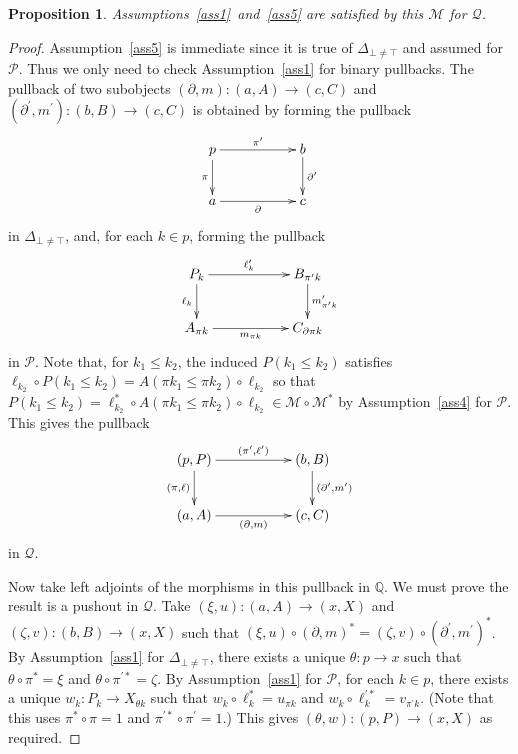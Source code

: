 \documentclass[a4paper,12pt,reqno]{amsart}
\newtheorem{proposition}[theorem]{Proposition}
\theoremstyle{definition}
\theoremstyle{fact}
\theoremstyle{genquest}
\theoremstyle{step}
\newcommand{\lra}{\longrightarrow}
\newcommand{\ra}{\rightarrow}
\def\CM{{\mathscr M}}
\def\CP{{\mathscr P}}
\def\CQ{{\mathscr Q}}
\begin{document}
\begin{proposition}\label{meets}
Assumptions~\ref{ass1}~and~\ref{ass5} are satisfied by this $\CM$ for $\CQ$.
\end{proposition}
\begin{proof}
Assumption~\ref{ass5} is immediate since it is true of $\Delta_{\bot \neq \top}$ and assumed for $\CP$. Thus we only need to check Assumption~\ref{ass1}
for binary pullbacks.  
The pullback of two subobjects $(\partial,m):(a,A)\lra (c,C)$ and 
$(\partial^{\prime},m^{\prime}):(b,B)\lra (c,C)$ is obtained by forming the pullback  
\begin{equation*}
\xymatrix{
p \ar[rr]^-{\pi^{\prime}} \ar[d]_-{\pi} && b \ar[d]^-{\partial^{\prime}} \\
a \ar[rr]_-{\partial} && c}
\end{equation*}
in $\Delta_{\bot \neq \top}$, and, for each $k\in p$, forming the pullback 
\begin{equation*}
\xymatrix{
P_k \ar[rr]^-{\ell_k^{\prime}} \ar[d]_-{\ell_k} && B_{\pi^{\prime} k} \ar[d]^-{m^{\prime}_{\pi^{\prime}k}} \\
A_{\pi k} \ar[rr]_-{m_{\pi k}} && C_{\partial \pi k}}
\end{equation*}
in $\CP$. Note that, for $k_1\le k_2$, the induced $P(k_1\le k_2)$ satisfies
$\ell_{k_2}\circ P(k_1\le k_2) = A(\pi k_1\le \pi k_2)\circ \ell_{k_2}$ so that
$P(k_1\le k_2) = \ell_{k_2}^*\circ A(\pi k_1\le \pi k_2)\circ \ell_{k_2} \in \CM \circ \CM^*$
by Assumption~\ref{ass4} for $\CP$.  
This gives the pullback
\begin{equation*}
\xymatrix{
(p,P) \ar[rr]^-{(\pi^{\prime},\ell^{\prime})} \ar[d]_-{(\pi,\ell)} && (b,B) \ar[d]^-{(\partial^{\prime},m^{\prime})} \\
(a,A) \ar[rr]_-{(\partial,m)} && (c,C)}
\end{equation*}
in $\CQ$.

Now take left adjoints of the morphisms in this pullback in $\mathbb{Q}$.
We must prove the result is a pushout in $\CQ$.
Take $(\xi,u):(a,A)\ra (x,X)$ and $(\zeta,v):(b,B)\ra (x,X)$ such that
$(\xi,u)\circ (\partial,m)^* = (\zeta,v)\circ (\partial^{\prime},m^{\prime})^*$.
By Assumption~\ref{ass1} for $\Delta_{\bot \neq \top}$, there exists a unique 
$\theta : p\ra x$
such that $\theta\circ \pi^*=\xi$ and $\theta \circ \pi^{\prime *}= \zeta$. 
By Assumption~\ref{ass1} for $\CP$, for each $k\in p$, there exists a unique 
$w_k:P_k\ra X_{\theta k}$ such that $w_k\circ \ell_k^*=u_{\pi k}$
and $w_k\circ \ell^{\prime *}_k=v_{\pi^{\prime} k}$.
(Note that this uses $\pi^{*}\circ \pi =1$ and
$\pi^{\prime *}\circ \pi^{\prime} =1$.) 
This gives $(\theta, w) : (p,P)\ra (x,X)$ as required. 
\end{proof} 
\end{document}
